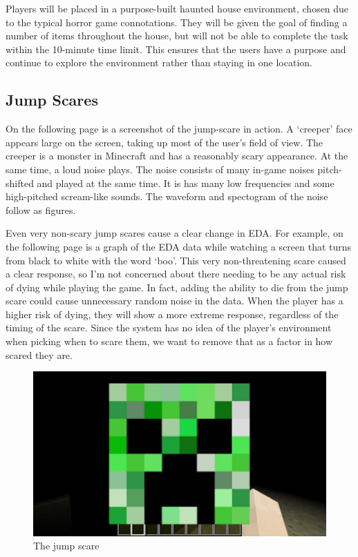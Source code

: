 \documentclass[12pt,a4paper]{article}
\begin{document}
Players will be placed in a purpose-built haunted house environment, chosen due to the typical horror game connotations. They will be given the goal of finding a number of items throughout the house, but will not be able to complete the task within the 10-minute time limit. This ensures that the users have a purpose and continue to explore the environment rather than staying in one location.

\subsection{Jump Scares}
On the following page is a screenshot of the jump-scare in action. A `creeper' face appears large on the screen, taking up most of the user's field of view. The creeper is a monster in Minecraft and has a reasonably scary appearance. At the same time, a loud noise plays. The noise consists of many in-game noises pitch-shifted and played at the same time. It is has many low frequencies and some high-pitched scream-like sounds. The waveform and spectogram of the noise follow as figures.

Even very non-scary jump scares cause a clear change in EDA. For example, on the following page is a graph of the EDA data while watching a screen that turns from black to white with the word `boo'. This very non-threatening scare caused a clear response, so I'm not concerned about there needing to be any actual risk of dying while playing the game. In fact, adding the ability to die from the jump scare could cause unnecessary random noise in the data. When the player has a higher risk of dying, they will show a more extreme response, regardless of the timing of the scare. Since the system has no idea of the player's environment when picking when to scare them, we want to remove that as a factor in how scared they are.

\begin{figure}[!htbp]
		\begin{center}
\includegraphics[width=0.8\linewidth]{scare.png}
\caption{The jump scare}
	\end{center}
\end{figure}
\end{document}
